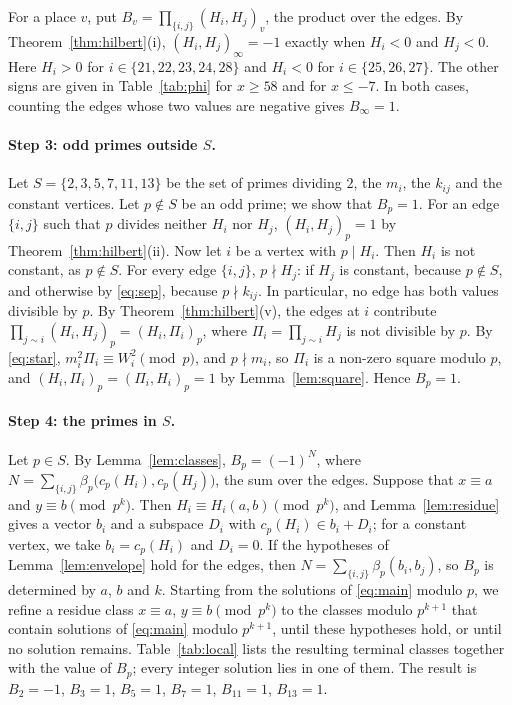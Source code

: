 \documentclass[11pt]{article}
\begin{document}
For a place $v$, put $B_v=\prod_{\{i,j\}}(H_i,H_j)_v$, the product over the edges. By Theorem~\ref{thm:hilbert}(i), $(H_i,H_j)_\infty=-1$ exactly when $H_i<0$ and $H_j<0$. Here $H_i>0$ for $i\in\{21,\allowbreak 22,\allowbreak 23,\allowbreak 24,\allowbreak 28\}$ and $H_i<0$ for $i\in\{25,\allowbreak 26,\allowbreak 27\}$. The other signs are given in Table~\ref{tab:phi} for $x\geq58$ and for $x\leq-7$. In both cases, counting the edges whose two values are negative gives $B_\infty=1$.

\paragraph{Step 3: odd primes outside $S$.} Let $S=\{2,3,5,7,11,13\}$ be the set of primes dividing $2$, the $m_{i}$, the $k_{ij}$ and the constant vertices. Let $p\notin S$ be an odd prime; we show that $B_p=1$. For an edge $\{i,j\}$ such that $p$ divides neither $H_i$ nor $H_j$, $(H_i,H_j)_p=1$ by Theorem~\ref{thm:hilbert}(ii). Now let $i$ be a vertex with $p\mid H_i$. Then $H_i$ is not constant, as $p\notin S$. For every edge $\{i,j\}$, $p\nmid H_j$: if $H_j$ is constant, because $p\notin S$, and otherwise by \eqref{eq:sep}, because $p\nmid k_{ij}$. In particular, no edge has both values divisible by $p$. By Theorem~\ref{thm:hilbert}(v), the edges at $i$ contribute $\prod_{j\sim i}(H_i,H_j)_p=(H_i,\Pi_i)_p$, where $\Pi_i=\prod_{j\sim i}H_j$ is not divisible by $p$. By \eqref{eq:star}, $m_i^2\Pi_i\equiv W_i^2\pmod p$, and $p\nmid m_i$, so $\Pi_i$ is a non-zero square modulo $p$, and $(H_i,\Pi_i)_p=(\Pi_i,H_i)_p=1$ by Lemma~\ref{lem:square}. Hence $B_p=1$.

\paragraph{Step 4: the primes in $S$.} Let $p\in S$. By Lemma~\ref{lem:classes}, $B_p=(-1)^{N}$, where $N=\sum_{\{i,j\}}\beta_p\bigl(c_p(H_i),c_p(H_j)\bigr)$, the sum over the edges. Suppose that $x\equiv a$ and $y\equiv b\pmod{p^k}$. Then $H_i\equiv H_i(a,b)\pmod{p^k}$, and Lemma~\ref{lem:residue} gives a vector $b_i$ and a subspace $D_i$ with $c_p(H_i)\in b_i+D_i$; for a constant vertex, we take $b_i=c_p(H_i)$ and $D_i=0$. If the hypotheses of Lemma~\ref{lem:envelope} hold for the edges, then $N=\sum_{\{i,j\}}\beta_p(b_i,b_j)$, so $B_p$ is determined by $a$, $b$ and $k$. Starting from the solutions of \eqref{eq:main} modulo $p$, we refine a residue class $x\equiv a$, $y\equiv b\pmod{p^k}$ to the classes modulo $p^{k+1}$ that contain solutions of \eqref{eq:main} modulo $p^{k+1}$, until these hypotheses hold, or until no solution remains. Table~\ref{tab:local} lists the resulting terminal classes together with the value of $B_p$; every integer solution lies in one of them. The result is $B_{2}=-1$, $B_{3}=1$, $B_{5}=1$, $B_{7}=1$, $B_{11}=1$, $B_{13}=1$.
\end{document}

